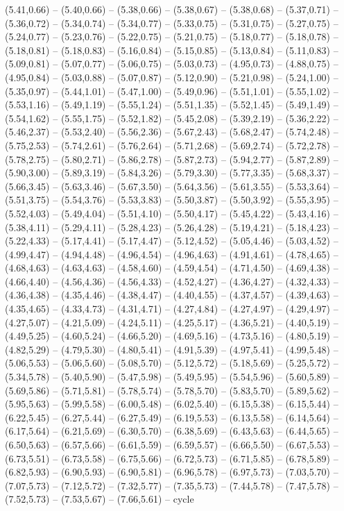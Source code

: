 {(5.41,0.66) -- (5.40,0.66) -- (5.38,0.66) -- (5.38,0.67) -- (5.38,0.68) -- (5.37,0.71) -- (5.36,0.72) -- (5.34,0.74) -- (5.34,0.77) -- (5.33,0.75) -- (5.31,0.75) -- (5.27,0.75) -- (5.24,0.77) -- (5.23,0.76) -- (5.22,0.75) -- (5.21,0.75) -- (5.18,0.77) -- (5.18,0.78) -- (5.18,0.81) -- (5.18,0.83) -- (5.16,0.84) -- (5.15,0.85) -- (5.13,0.84) -- (5.11,0.83) -- (5.09,0.81) -- (5.07,0.77) -- (5.06,0.75) -- (5.03,0.73) -- (4.95,0.73) -- (4.88,0.75) -- (4.95,0.84) -- (5.03,0.88) -- (5.07,0.87) -- (5.12,0.90) -- (5.21,0.98) -- (5.24,1.00) -- (5.35,0.97) -- (5.44,1.01) -- (5.47,1.00) -- (5.49,0.96) -- (5.51,1.01) -- (5.55,1.02) -- (5.53,1.16) -- (5.49,1.19) -- (5.55,1.24) -- (5.51,1.35) -- (5.52,1.45) -- (5.49,1.49) -- (5.54,1.62) -- (5.55,1.75) -- (5.52,1.82) -- (5.45,2.08) -- (5.39,2.19) -- (5.36,2.22) -- (5.46,2.37) -- (5.53,2.40) -- (5.56,2.36) -- (5.67,2.43) -- (5.68,2.47) -- (5.74,2.48) -- (5.75,2.53) -- (5.74,2.61) -- (5.76,2.64) -- (5.71,2.68) -- (5.69,2.74) -- (5.72,2.78) -- (5.78,2.75) -- (5.80,2.71) -- (5.86,2.78) -- (5.87,2.73) -- (5.94,2.77) -- (5.87,2.89) -- (5.90,3.00) -- (5.89,3.19) -- (5.84,3.26) -- (5.79,3.30) -- (5.77,3.35) -- (5.68,3.37) -- (5.66,3.45) -- (5.63,3.46) -- (5.67,3.50) -- (5.64,3.56) -- (5.61,3.55) -- (5.53,3.64) -- (5.51,3.75) -- (5.54,3.76) -- (5.53,3.83) -- (5.50,3.87) -- (5.50,3.92) -- (5.55,3.95) -- (5.52,4.03) -- (5.49,4.04) -- (5.51,4.10) -- (5.50,4.17) -- (5.45,4.22) -- (5.43,4.16) -- (5.38,4.11) -- (5.29,4.11) -- (5.28,4.23) -- (5.26,4.28) -- (5.19,4.21) -- (5.18,4.23) -- (5.22,4.33) -- (5.17,4.41) -- (5.17,4.47) -- (5.12,4.52) -- (5.05,4.46) -- (5.03,4.52) -- (4.99,4.47) -- (4.94,4.48) -- (4.96,4.54) -- (4.96,4.63) -- (4.91,4.61) -- (4.78,4.65) -- (4.68,4.63) -- (4.63,4.63) -- (4.58,4.60) -- (4.59,4.54) -- (4.71,4.50) -- (4.69,4.38) -- (4.66,4.40) -- (4.56,4.36) -- (4.56,4.33) -- (4.52,4.27) -- (4.36,4.27) -- (4.32,4.33) -- (4.36,4.38) -- (4.35,4.46) -- (4.38,4.47) -- (4.40,4.55) -- (4.37,4.57) -- (4.39,4.63) -- (4.35,4.65) -- (4.33,4.73) -- (4.31,4.71) -- (4.27,4.84) -- (4.27,4.97) -- (4.29,4.97) -- (4.27,5.07) -- (4.21,5.09) -- (4.24,5.11) -- (4.25,5.17) -- (4.36,5.21) -- (4.40,5.19) -- (4.49,5.25) -- (4.60,5.24) -- (4.66,5.20) -- (4.69,5.16) -- (4.73,5.16) -- (4.80,5.19) -- (4.82,5.29) -- (4.79,5.30) -- (4.80,5.41) -- (4.91,5.39) -- (4.97,5.41) -- (4.99,5.48) -- (5.06,5.53) -- (5.06,5.60) -- (5.08,5.70) -- (5.12,5.72) -- (5.18,5.69) -- (5.25,5.72) -- (5.34,5.78) -- (5.40,5.90) -- (5.47,5.98) -- (5.49,5.95) -- (5.54,5.96) -- (5.60,5.89) -- (5.69,5.86) -- (5.71,5.81) -- (5.78,5.74) -- (5.78,5.70) -- (5.83,5.70) -- (5.89,5.62) -- (5.95,5.63) -- (5.99,5.58) -- (6.00,5.48) -- (6.02,5.40) -- (6.15,5.38) -- (6.15,5.44) -- (6.22,5.45) -- (6.27,5.44) -- (6.27,5.49) -- (6.19,5.53) -- (6.13,5.58) -- (6.14,5.64) -- (6.17,5.64) -- (6.21,5.69) -- (6.30,5.70) -- (6.38,5.69) -- (6.43,5.63) -- (6.44,5.65) -- (6.50,5.63) -- (6.57,5.66) -- (6.61,5.59) -- (6.59,5.57) -- (6.66,5.50) -- (6.67,5.53) -- (6.73,5.51) -- (6.73,5.58) -- (6.75,5.66) -- (6.72,5.73) -- (6.71,5.85) -- (6.78,5.89) -- (6.82,5.93) -- (6.90,5.93) -- (6.90,5.81) -- (6.96,5.78) -- (6.97,5.73) -- (7.03,5.70) -- (7.07,5.73) -- (7.12,5.72) -- (7.32,5.77) -- (7.35,5.73) -- (7.44,5.78) -- (7.47,5.78) -- (7.52,5.73) -- (7.53,5.67) -- (7.66,5.61) -- cycle}

